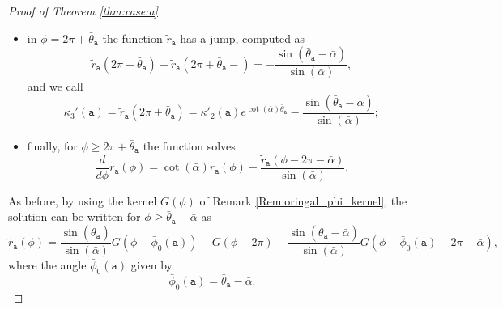 \documentclass[reqno]{amsart}
\theoremstyle{definition} \newtheorem{definition}{Definition}[section]
\theoremstyle{definition} \newtheorem{remark}[definition]{Remark}
\theoremstyle{plain} \newtheorem{lemma}[definition]{Lemma}
\theoremstyle{plain} \newtheorem{proposition}[definition]{Proposition}
\theoremstyle{plain} \newtheorem{theorem}[definition]{Theorem}
\theoremstyle{plain} \newtheorem{corollary}[definition]{Corollary}
\theoremstyle{definition} \newtheorem{example}[definition]{Example}
\theoremstyle{plain} \newtheorem{claim}[clai]{Claim}
\theoremstyle{definition} \newtheorem{assumption}[definition]{Assumption}
\theoremstyle{definition} \newtheorem{observation}[definition]{Observation}
\newcommand{\1}{\mathbbm 1}
\numberwithin{equation}{section} %
\theoremstyle{plain} \newtheorem*{theorem*}{Theorem}
\theoremstyle{plain} \newtheorem{mthm}[maintheorem]{Main Theorem}
\theoremstyle{plain} \newtheorem*{mthm*}{Main Theorem}
\theoremstyle{plain} \newtheorem*{conjecture*}{Conjecture}
\theoremstyle{plain} \newtheorem{conjecture}[definition]{Conjecture}
\theoremstyle{plain} \newtheorem*{problem*}{Problem}
\begin{document}
\begin{proof}[Proof of Theorem \ref{thm:case:a}]
\begin{itemize}
\begin{equation*}
\end{equation*}
so that
\begin{equation*}
\tilde r_{\mathtt a}(\phi) = \kappa'_2(\mathtt a) e^{\cot(\bar\alpha) (\phi - 2\pi)};
\end{equation*}
\item in $\phi=2\pi+\bar\theta_{\mathtt a}$ the function $\tilde r_{\mathtt a}$ has a jump, computed as
\begin{equation*}
\tilde r_{\mathtt a}(2\pi + \bar \theta_{\mathtt a}) - \tilde r_{\mathtt a}(2\pi + \bar \theta_{\mathtt a}-) = - \frac{\sin(\bar\theta_{\mathtt a} - \bar \alpha)}{\sin(\bar \alpha)},
\end{equation*}
and we call
$$
\kappa_3'(\mathtt a) = \tilde r_{\mathtt a}(2\pi + \bar \theta_{\mathtt a}) = \kappa'_2(\mathtt a) e^{\cot(\bar \alpha) \bar \theta_{\mathtt a}} - \frac{\sin(\bar \theta_{\mathtt a} - \bar \alpha)}{\sin(\bar \alpha)};
$$
\item finally, for $\phi \geq 2\pi+\bar\theta_{\mathtt a}$ the function solves
\begin{equation*}
\frac{d}{d\phi} \tilde r_{\mathtt a}(\phi) = \cot(\bar \alpha) \tilde r_{\mathtt a}(\phi) - \frac{\tilde r_{\mathtt a}(\phi - 2\pi - \bar \alpha)}{\sin(\bar\alpha)}.
\end{equation*}
\end{itemize}

As before, by using the kernel $G(\phi)$ of Remark \ref{Rem:oringal_phi_kernel}, the solution can be written for $\phi \geq \bar \theta_\mathtt a - \bar \alpha$ as
\begin{equation*}
\tilde r_{\mathtt a}(\phi) = \frac{\sin(\bar \theta_\mathtt a)}{\sin(\bar \alpha)} G(\phi - \bar \phi_0(\mathtt a)) - G(\phi - 2\pi) - \frac{\sin(\bar \theta_\mathtt a - \bar \alpha)}{\sin(\bar \alpha)} G(\phi - \bar \phi_0(\mathtt a) - 2\pi - \bar \alpha),
\end{equation*}
where the angle $\bar \phi_0(\mathtt a)$ given by
\begin{equation*}
\bar \phi_0(\mathtt a) = \bar \theta_\mathtt a - \bar \alpha.
\end{equation*}

\medskip


\end{proof}
\end{document}
